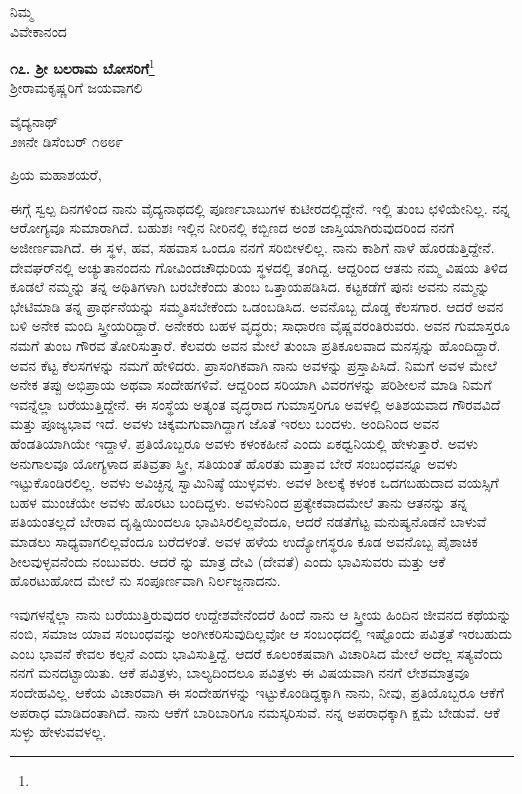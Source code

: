 {\flushright
ನಿಮ್ಮ\\ವಿವೇಕಾನಂದ\par}

\newpage
\begin{center}
\textbf{೧೭. ಶ‍್ರೀ ಬಲರಾಮ ಬೋಸರಿಗೆ}\footnote{}\\ ಶ‍್ರೀರಾಮಕೃಷ್ಣರಿಗೆ ಜಯವಾಗಲಿ
\end{center}

\begin{flushright}
ವೈದ್ಯನಾಥ್\\೨೫ನೇ ಡಿಸೆಂಬರ್‌ ೧೮೮೯
\end{flushright}

\noindent
ಪ್ರಿಯ ಮಹಾಶಯರೆ,

ಈಗ್ಗೆ ಸ್ವಲ್ಪ ದಿನಗಳಿಂದ ನಾನು ವೈದ್ಯನಾಥದಲ್ಲಿ ಪೂರ್ಣಬಾಬುಗಳ ಕುಟೀರದಲ್ಲಿದ್ದೇನೆ. ಇಲ್ಲಿ ತುಂಬ ಛಳಿಯೇನಿಲ್ಲ. ನನ್ನ ಆರೋಗ್ಯವೂ ಸುಮಾರಾಗಿದೆ. ಬಹುಶಃ ಇಲ್ಲಿನ ನೀರಿನಲ್ಲಿ ಕಬ್ಬಿಣದ ಅಂಶ ಜಾಸ್ತಿಯಾಗಿರುವುದರಿಂದ ನನಗೆ ಅಜೀರ್ಣವಾಗಿದೆ. ಈ ಸ್ಥಳ, ಹವ, ಸಹವಾಸ ಒಂದೂ ನನಗೆ ಸರಿಬೀಳಲಿಲ್ಲ. ನಾನು ಕಾಶಿಗೆ ನಾಳೆ ಹೊರಡುತ್ತಿದ್ದೇನೆ. ದೇವಘರ್‌ನಲ್ಲಿ ಅಚ್ಯುತಾನಂದನು ಗೋವಿಂದಚೌಧುರಿಯ ಸ್ಥಳದಲ್ಲಿ ತಂಗಿದ್ದ. ಆದ್ದರಿಂದ ಆತನು ನಮ್ಮ ವಿಷಯ ತಿಳಿದ ಕೂಡಲೆ ನಮ್ಮನ್ನು ತನ್ನ ಅಥಿತಿಗಳಾಗಿ ಬರಬೇಕೆಂದು ತುಂಬ ಒತ್ತಾಯಪಡಿಸಿದ. ಕಟ್ಟಕಡೆಗೆ ಪುನಃ ಅವನು ನಮ್ಮನ್ನು ಭೇಟಿಮಾಡಿ ತನ್ನ ಪ್ರಾರ್ಥನೆಯನ್ನು ಸಮ್ಮತಿಸಬೇಕೆಂದು ಒಡಂಬಡಿಸಿದ. ಅವನೊಬ್ಬ ದೊಡ್ಡ ಕೆಲಸಗಾರ. ಆದರೆ ಅವನ ಬಳಿ ಅನೇಕ ಮಂದಿ ಸ್ತ್ರೀಯರಿದ್ದಾರೆ. ಅನೇಕರು ಬಹಳ ವೃದ್ಧರು; ಸಾಧಾರಣ ವೈಷ್ಣವರಂತಿರುವರು. ಅವನ ಗುಮಾಸ್ತರೂ ನಮಗೆ ತುಂಬ ಗೌರವ ತೋರಿಸುತ್ತಾರೆ. ಕೆಲವರು ಅವನ ಮೇಲೆ ತುಂಬಾ ಪ್ರತಿಕೂಲವಾದ ಮನಸ್ಸನ್ನು ಹೊಂದಿದ್ದಾರೆ. ಅವನ ಕೆಟ್ಟ ಕೆಲಸಗಳನ್ನು ನಮಗೆ ಹೇಳಿದರು. ಪ್ರಾಸಂಗಿಕವಾಗಿ ನಾನು \enginline{-} ಅವಳನ್ನು ಪ್ರಸ್ತಾಪಿಸಿದೆ. ನಿಮಗೆ ಅವಳ ಮೇಲೆ ಅನೇಕ ತಪ್ಪು ಅಭಿಪ್ರಾಯ ಅಥವಾ ಸಂದೇಹಗಳಿವೆ. ಆದ್ದರಿಂದ ಸರಿಯಾಗಿ ವಿವರಗಳನ್ನು ಪರಿಶೀಲನೆ ಮಾಡಿ ನಿಮಗೆ ಇವನ್ನೆಲ್ಲಾ ಬರೆಯುತ್ತಿದ್ದೇನೆ. ಈ ಸಂಸ್ಥೆಯ ಅತ್ಯಂತ ವೃದ್ಧರಾದ ಗುಮಾಸ್ತರಿಗೂ ಅವಳಲ್ಲಿ ಅತಿಶಯವಾದ ಗೌರವವಿದೆ ಮತ್ತು ಪೂಜ್ಯಭಾವ ಇದೆ. ಅವಳು ಚಿಕ್ಕಮಗುವಾಗಿದ್ದಾಗ \enginline{-} ಜೊತೆ ಇರಲು ಬಂದಳು. ಅಂದಿನಿಂದ ಅವನ ಹೆಂಡತಿಯಾಗಿಯೇ ಇದ್ದಾಳೆ. ಪ್ರತಿಯೊಬ್ಬರೂ ಅವಳು ಕಳಂಕಹೀನೆ ಎಂದು ಏಕಧ್ವನಿಯಲ್ಲಿ ಹೇಳುತ್ತಾರೆ. ಅವಳು ಅನುಗಾಲವೂ ಯೋಗ್ಯಳಾದ ಪತಿವ್ರತಾ ಸ್ತ್ರೀ, ಸತಿಯಂತೆ ಹೊರತು ಮತ್ತಾವ ಬೇರೆ ಸಂಬಂಧವನ್ನೂ ಅವಳು ಇಟ್ಟುಕೊಂಡಿರಲಿಲ್ಲ. ಅವಳು ಅವಿಚ್ಛಿನ್ನ ಸ್ವಾಮಿನಿಷ್ಠೆ ಯುಳ್ಳವಳು. ಅವಳ ಶೀಲಕ್ಕೆ ಕಳಂಕ ಒದಗಬಹುದಾದ ವಯಸ್ಸಿಗೆ ಬಹಳ ಮುಂಚೆಯೇ ಅವಳು ಹೊರಟು ಬಂದಿದ್ದಳು. ಅವಳು\enginline{-}ನಿಂದ ಪ್ರತ್ಯೇಕವಾದಮೇಲೆ ತಾನು ಆತನನ್ನು ತನ್ನ ಪತಿಯಂತಲ್ಲದೆ ಬೇರಾವ ದೃಷ್ಟಿಯಿಂದಲೂ ಭಾವಿಸಿರಲಿಲ್ಲವೆಂದೂ, ಆದರೆ ನಡತೆಗೆಟ್ಟ ಮನುಷ್ಯನೊಡನೆ ಬಾಳುವೆ ಮಾಡಲು ಸಾಧ್ಯವಾಗಲಿಲ್ಲವೆಂದೂ ಬರೆದಳಂತೆ. ಅವಳ ಹಳೆಯ ಉದ್ಯೋಗಸ್ಥರೂ ಕೂಡ ಅವನೊಬ್ಬ ಪೈಶಾಚಿಕ ಶೀಲವುಳ್ಳವನೆಂದು ನಂಬುವರು. ಆದರೆ \enginline{-} ನ್ನು ಮಾತ್ರ ದೇವಿ (ದೇವತೆ) ಎಂದು ಭಾವಿಸುವರು ಮತ್ತು ಆಕೆ ಹೊರಟುಹೋದ ಮೇಲೆ \enginline{-} ನು ಸಂಪೂರ್ಣವಾಗಿ ನಿರ್ಲಜ್ಜನಾದನು.

ಇವುಗಳನ್ನೆಲ್ಲಾ ನಾನು ಬರೆಯುತ್ತಿರುವುದರ ಉದ್ದೇಶವೇನೆಂದರೆ ಹಿಂದೆ ನಾನು ಆ ಸ್ತ್ರೀಯ ಹಿಂದಿನ ಜೀವನದ ಕಥೆಯನ್ನು ನಂಬಿ, ಸಮಾಜ ಯಾವ ಸಂಬಂಧವನ್ನು ಅಂಗೀಕರಿಸುವುದಿಲ್ಲವೋ ಆ ಸಂಬಂಧದಲ್ಲಿ ಇಷ್ಟೊಂದು ಪವಿತ್ರತೆ ಇರಬಹುದು ಎಂಬ ಭಾವನೆ ಕೇವಲ ಕಲ್ಪನೆ ಎಂದು ಭಾವಿಸುತ್ತಿದ್ದೆ. ಆದರೆ ಕೂಲಂಕಷವಾಗಿ ವಿಚಾರಿಸಿದ ಮೇಲೆ ಅದೆಲ್ಲ ಸತ್ಯವೆಂದು ನನಗೆ ಮನದಟ್ಟಾಯಿತು. ಆಕೆ ಪವಿತ್ರಳು, ಬಾಲ್ಯದಿಂದಲೂ ಪವಿತ್ರಳು \enginline{-} ಈ ವಿಷಯವಾಗಿ ನನಗೆ ಲೇಶಮಾತ್ರವೂ ಸಂದೇಹವಿಲ್ಲ. ಆಕೆಯ ವಿಚಾರವಾಗಿ ಈ ಸಂದೇಹಗಳನ್ನು ಇಟ್ಟುಕೊಂಡಿದ್ದಕ್ಕಾಗಿ ನಾನು, ನೀವು, ಪ್ರತಿಯೊಬ್ಬರೂ ಆಕೆಗೆ ಅಪರಾಧ ಮಾಡಿದಂತಾಗಿದೆ. ನಾನು ಆಕೆಗೆ ಬಾರಿಬಾರಿಗೂ ನಮಸ್ಕರಿಸುವೆ. ನನ್ನ ಅಪರಾಧಕ್ಕಾಗಿ ಕ್ಷಮೆ ಬೇಡುವೆ. ಆಕೆ ಸುಳ್ಳು ಹೇಳುವವಳಲ್ಲ.

